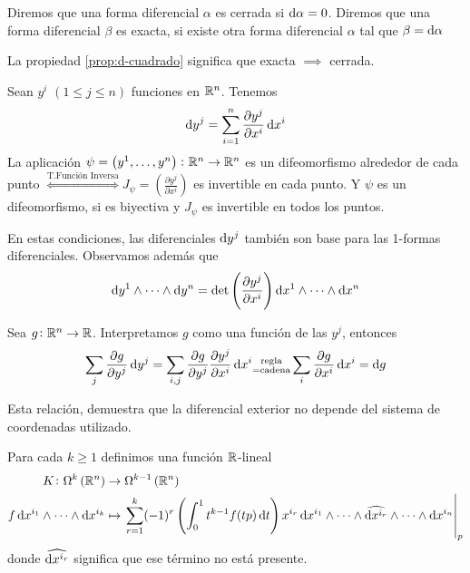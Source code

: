 \begin{defi}
    Diremos que una forma diferencial $\alpha$ es cerrada si $\dif \alpha =0$. Diremos que una forma diferencial $\beta$ es exacta, si existe otra
    forma diferencial $\alpha$ tal que $\beta = \dif \alpha$
\end{defi}

\begin{obs*}
    La propiedad \ref{prop:d-cuadrado} significa que exacta $\implies$ cerrada.
\end{obs*}

\begin{prop}
    Sean $y^i$ $(1 \leq j \leq n)$ funciones en $\mathbb{R}^n$. Tenemos
    \[
        \dif y^j = \sum^n_{i=1} \frac{\partial y^j}{\partial x^i} \dif x^i
    \]
    La aplicación $\psi = \left( y^1, \dots, y^n \right) \colon \mathbb{R}^n \to \mathbb{R}^n$ es un difeomorfismo alrededor de cada punto
    $\stackrel{\text{T.Función Inversa}}{\iff} J_\psi = \left( \frac{\partial y^j}{\partial x^i} \right)$ es invertible en cada punto.
    Y $\psi$ es un difeomorfismo, si es biyectiva y $J_\psi$ es invertible en todos los puntos.

    En estas condiciones, las diferenciales $\dif y^j$ tambi\'en son base para las 1-formas diferenciales. Observamos además que
    \[
        \dif y^1 \wedge \cdots \wedge \dif y^n = \det \left( \frac{\partial y^j}{\partial x^i} \right) \dif x^1 \wedge \cdots \wedge \dif x^n
    \]
\end{prop}

\begin{obs}
    Sea $g \colon \mathbb{R}^n \to \mathbb{R}$. Interpretamos $g$ como una función de las $y^j$, entonces
    \[
        \sum_j \frac{\partial g}{\partial y^j} \dif y^j = \sum_{i, j} \frac{\partial g}{\partial y^j} \frac{\partial y^j}{\partial x^i} \dif x^i
        \substack{\text{regla} \\ = \text{cadena}} \sum_i \frac{\partial g}{\partial x^i} \dif x^i = \dif g
    \]

    Esta relación, demuestra que la diferencial exterior no depende del sistema de coordenadas utilizado.
\end{obs}

\begin{defi}
    Para cada $k \geq 1$ definimos una función $\mathbb{R}$-lineal
    \[
        \begin{aligned}
            K \colon \Omega^k\left( \real^n \right) &\to \Omega^{k-1}\left( \real^n \right) \\
            f \dif x^{i_1} \wedge \cdots \wedge \dif x^{i_k} &\mapsto \left. \sum^k_{r=1} (-1)^r \left( \int^1_0 t^{k-1} f(tp) \dif t\right) x^{i_r}
            \dif x^{i_1} \wedge \cdots \wedge \widehat{\dif x^{i_r}} \wedge \cdots \wedge \dif x^{i_n} \right\vert_p
        \end{aligned}
    \]
    donde $\widehat{\dif x^{i_r}}$ significa que ese t\'ermino no está presente.
\end{defi}

